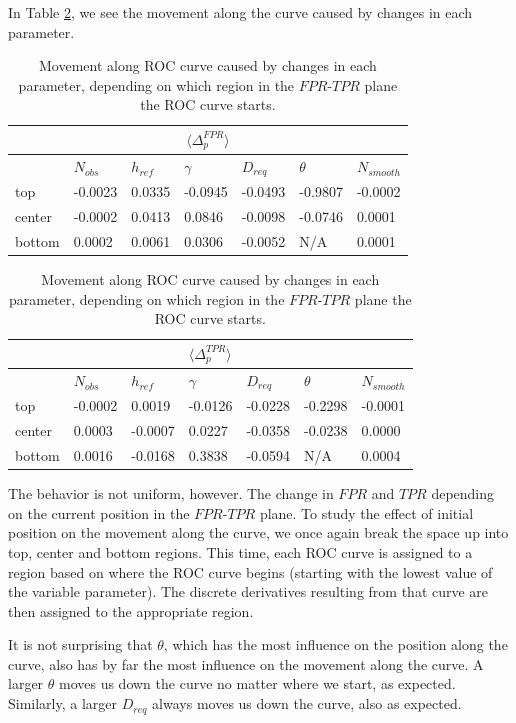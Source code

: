 In Table \ref{tbl:roc_deltas}, we see the movement along the curve caused by
changes in each parameter.
\begin{table}
\begin{center}
\begin{tabular}{|l|llllll|}
\multicolumn{7}{c}{$\langle \Delta_p^{FPR} \rangle$}\\
\hline
& $N_{obs}$ & $h_{ref}$ &$\gamma$ & $D_{req}$ & $\theta$ & $N_{smooth}$\\\hline
top & -0.0023 & 0.0335 & -0.0945 & -0.0493 & -0.9807 & -0.0002\\
center & -0.0002 & 0.0413 & 0.0846 & -0.0098 & -0.0746 & 0.0001\\
bottom & 0.0002 & 0.0061 & 0.0306 & -0.0052 & N/A & 0.0001\\
\hline
\end{tabular}
\begin{tabular}{|l|llllll|}
\multicolumn{7}{c}{$\langle \Delta_p^{TPR} \rangle$}\\
\hline
& $N_{obs}$ & $h_{ref}$ &$\gamma$ & $D_{req}$ & $\theta$ & $N_{smooth}$\\\hline
top & -0.0002 & 0.0019 & -0.0126 & -0.0228 & -0.2298 & -0.0001\\
center & 0.0003 & -0.0007 & 0.0227 & -0.0358 & -0.0238 & 0.0000\\
bottom & 0.0016 & -0.0168 & 0.3838 & -0.0594 & N/A & 0.0004\\
\hline
\end{tabular}
\end{center}
\caption{\label{tbl:roc_deltas} Movement along ROC curve caused by changes in
  each parameter, depending on which region in the $FPR$-$TPR$ plane the ROC
  curve starts.}
\end{table}
The behavior is not uniform, however. The change in
$FPR$ and $TPR$ depending on the current position in the $FPR$-$TPR$ plane. To
study the effect of initial position on the movement along the curve, we once
again break the space up into top, center and bottom regions. This time, each
ROC curve is assigned to a region based on where the ROC curve begins (starting
with the lowest value of the variable parameter). The discrete derivatives
resulting from that curve are then assigned to the appropriate region.

It is not surprising that $\theta$, which has the most influence on the position
along the curve, also has by far the most influence on the movement along the
curve. A larger $\theta$ moves us down the curve no matter where we start, as
expected. Similarly, a larger $D_{req}$ always moves us down the curve, also as
expected. 

